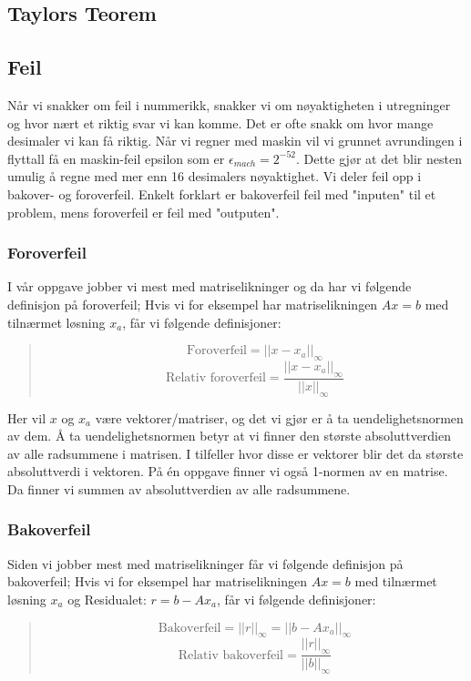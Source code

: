 \subsection{Taylors Teorem}

\subsection{Feil}
Når vi snakker om feil i nummerikk, snakker vi om nøyaktigheten i utregninger og hvor nært et riktig svar vi kan komme. Det er ofte snakk om hvor mange desimaler vi kan få riktig. Når vi regner med maskin vil vi grunnet avrundingen i flyttall få en maskin-feil epsilon som er $\epsilon_{mach} = 2^{-52}$. Dette gjør at det blir nesten umulig å regne med mer enn 16 desimalers nøyaktighet. Vi deler feil opp i bakover- og foroverfeil. Enkelt forklart er bakoverfeil feil med "inputen" til et problem, mens foroverfeil er feil med "outputen".

\subsubsection{Foroverfeil}
I vår oppgave jobber vi mest med matriselikninger og da har vi følgende definisjon på foroverfeil; Hvis vi for eksempel har matriselikningen $Ax = b$ med tilnærmet løsning $x_a$, får vi følgende definisjoner: 
\begin{quote}	
\begin{equation*}
\mbox{Foroverfeil} = ||x - x_a||_{\infty}
\end{equation*}
\begin{equation*}
\mbox{Relativ foroverfeil} = \frac{||x - x_a||_{\infty}}{||x||_{\infty}}
\end{equation*}
\end{quote}
Her vil $x$ og $x_a$ være vektorer/matriser, og det vi gjør er å ta uendelighetsnormen av dem. Å ta uendelighetsnormen betyr at vi finner den største absoluttverdien av alle radsummene i matrisen. I tilfeller hvor disse er vektorer blir det da største absoluttverdi i vektoren. På én oppgave finner vi også 1-normen av en matrise. Da finner vi summen av absoluttverdien av alle radsummene.

\subsubsection{Bakoverfeil}
Siden vi jobber mest med matriselikninger får vi følgende definisjon på bakoverfeil; Hvis vi for eksempel har matriselikningen $Ax = b$ med tilnærmet løsning $x_a$ og Residualet: $r = b - Ax_a$, får vi følgende definisjoner:
\begin{quote}	
\begin{equation*}
\mbox{Bakoverfeil} = ||r||_{\infty} = ||b-Ax_a||_{\infty}
\end{equation*}
\begin{equation*}
\mbox{Relativ bakoverfeil} = \frac{||r||_{\infty}}{||b||_{\infty}}
\end{equation*}
\end{quote}

